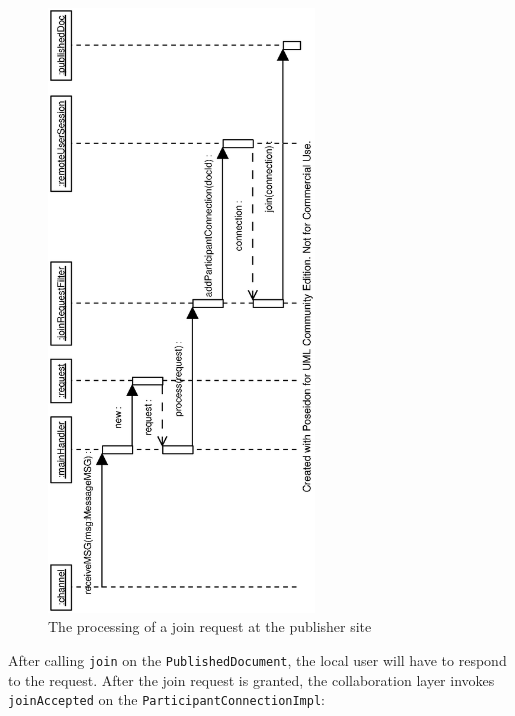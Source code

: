 \begin{figure}[htb]
 \centering
 \includegraphics[width=7.07cm,height=16cm,angle=270]{../images/finalreport/network_joinRequest_sequence.eps}
 \caption{The processing of a join request at the publisher site}
 \label{fig:network.protocol.joinrequest}
\end{figure}

After calling \texttt{join} on the \texttt{PublishedDocument}, the local user will have to respond to the request. After the join request is granted, the collaboration layer invokes \texttt{joinAccepted} on the \texttt{ParticipantConnectionImpl}:


